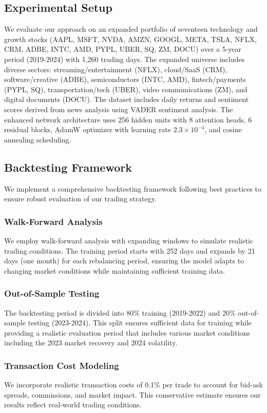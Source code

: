 \documentclass[12pt,a4paper]{article}
\begin{document}
\subsection{Experimental Setup}

We evaluate our approach on an expanded portfolio of seventeen technology and growth stocks (AAPL, MSFT, NVDA, AMZN, GOOGL, META, TSLA, NFLX, CRM, ADBE, INTC, AMD, PYPL, UBER, SQ, ZM, DOCU) over a 5-year period (2019-2024) with 1,260 trading days. The expanded universe includes diverse sectors: streaming/entertainment (NFLX), cloud/SaaS (CRM), software/creative (ADBE), semiconductors (INTC, AMD), fintech/payments (PYPL, SQ), transportation/tech (UBER), video communications (ZM), and digital documents (DOCU). The dataset includes daily returns and sentiment scores derived from news analysis using VADER sentiment analysis. The enhanced network architecture uses 256 hidden units with 8 attention heads, 6 residual blocks, AdamW optimizer with learning rate $2.3 \times 10^{-4}$, and cosine annealing scheduling.

\subsection{Backtesting Framework}

We implement a comprehensive backtesting framework following best practices to ensure robust evaluation of our trading strategy.

\subsubsection{Walk-Forward Analysis}
We employ walk-forward analysis with expanding windows to simulate realistic trading conditions. The training period starts with 252 days and expands by 21 days (one month) for each rebalancing period, ensuring the model adapts to changing market conditions while maintaining sufficient training data.

\subsubsection{Out-of-Sample Testing}
The backtesting period is divided into 80\% training (2019-2022) and 20\% out-of-sample testing (2023-2024). This split ensures sufficient data for training while providing a realistic evaluation period that includes various market conditions including the 2023 market recovery and 2024 volatility.

\subsubsection{Transaction Cost Modeling}
We incorporate realistic transaction costs of 0.1\% per trade to account for bid-ask spreads, commissions, and market impact. This conservative estimate ensures our results reflect real-world trading conditions.
\end{document}
